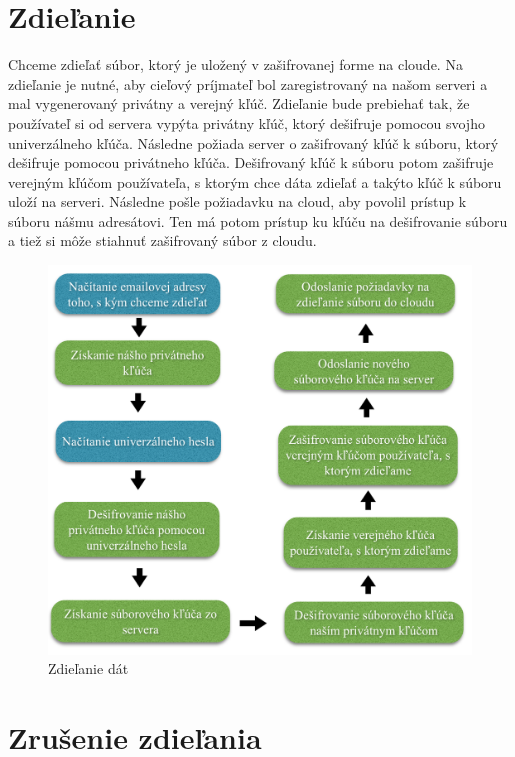 	\section{Zdieľanie}
	
		Chceme zdieľať súbor, ktorý je uložený v zašifrovanej forme na cloude. Na zdieľanie je nutné, aby cieľový príjmateľ bol zaregistrovaný na našom serveri a mal vygenerovaný privátny a verejný kľúč. Zdieľanie bude prebiehať tak, že používateľ si od servera vypýta privátny kľúč, ktorý dešifruje pomocou svojho univerzálneho kľúča. Následne požiada server o zašifrovaný kľúč k súboru, ktorý dešifruje pomocou privátneho kľúča. Dešifrovaný kľúč k súboru potom zašifruje verejným kľúčom používateľa, s ktorým chce dáta zdieľať a takýto kľúč k súboru uloží na serveri. Následne pošle požiadavku na cloud, aby povolil prístup k súboru nášmu adresátovi. Ten má potom prístup ku kľúču na dešifrovanie súboru a tiež si môže stiahnuť zašifrovaný súbor z cloudu.
		
		\begin{figure}[H]
			\begin{center}
				\includegraphics[width=1\linewidth]{images/zdielanie.png}
				\caption{Zdieľanie dát}
			\end{center}
		\end{figure}
		
	\section{Zrušenie zdieľania}
	
